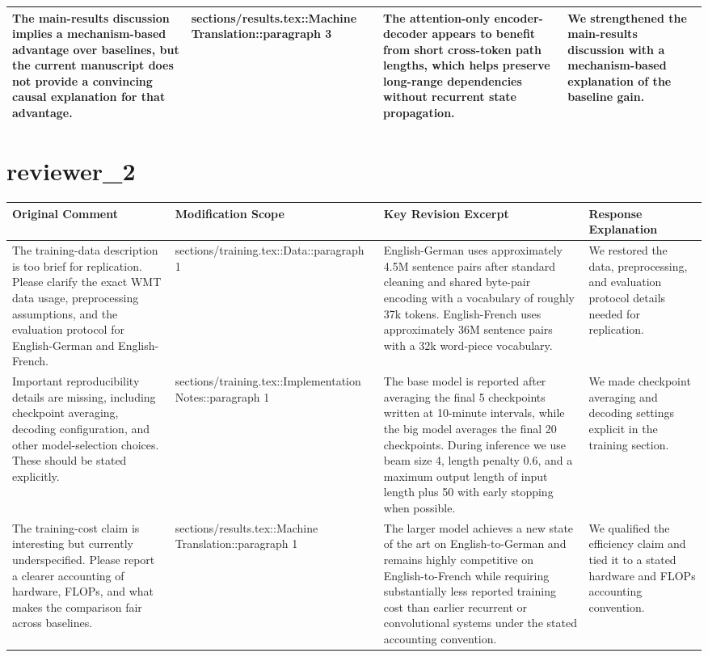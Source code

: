 \documentclass{article}
\begin{document}
\begin{longtable}{|p{}|p{}|p{}|p{}|}
\hline
The main-results discussion implies a mechanism-based advantage over baselines, but the current manuscript does not provide a convincing causal explanation for that advantage. & sections/results.tex::Machine Translation::paragraph 3 & The attention-only encoder-decoder appears to benefit from short cross-token path lengths, which helps preserve long-range dependencies without recurrent state propagation. & We strengthened the main-results discussion with a mechanism-based explanation of the baseline gain. \\
\hline
\end{longtable}
\section*{ reviewer\_2 }
\begin{longtable}{|p{}|p{}|p{}|p{}|}
\hline
Original Comment & Modification Scope & Key Revision Excerpt & Response Explanation \\
\hline
The training-data description is too brief for replication. Please clarify the exact WMT data usage, preprocessing assumptions, and the evaluation protocol for English-German and English-French. & sections/training.tex::Data::paragraph 1 & English-German uses approximately 4.5M sentence pairs after standard cleaning and shared byte-pair encoding with a vocabulary of roughly 37k tokens. English-French uses approximately 36M sentence pairs with a 32k word-piece vocabulary. & We restored the data, preprocessing, and evaluation protocol details needed for replication. \\
\hline
Important reproducibility details are missing, including checkpoint averaging, decoding configuration, and other model-selection choices. These should be stated explicitly. & sections/training.tex::Implementation Notes::paragraph 1 & The base model is reported after averaging the final 5 checkpoints written at 10-minute intervals, while the big model averages the final 20 checkpoints. During inference we use beam size 4, length penalty 0.6, and a maximum output length of input length plus 50 with early stopping when possible. & We made checkpoint averaging and decoding settings explicit in the training section. \\
\hline
The training-cost claim is interesting but currently underspecified. Please report a clearer accounting of hardware, FLOPs, and what makes the comparison fair across baselines. & sections/results.tex::Machine Translation::paragraph 1 & The larger model achieves a new state of the art on English-to-German and remains highly competitive on English-to-French while requiring substantially less reported training cost than earlier recurrent or convolutional systems under the stated accounting convention. & We qualified the efficiency claim and tied it to a stated hardware and FLOPs accounting convention. \\

\end{longtable}
\end{document}
